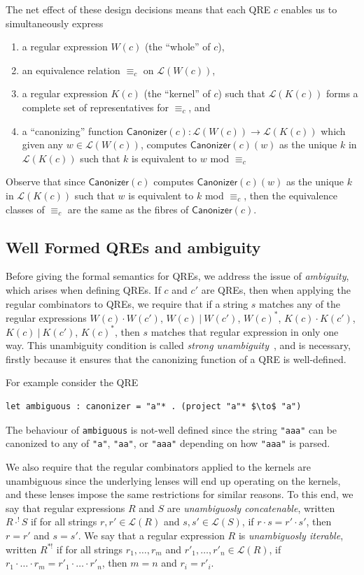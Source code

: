 \documentclass[acmsmall,review,anonymous]{acmart}
\newcommand{\kw}[1]{\ensuremath{\mathsf{#1}}}
\newcommand{\sep}{\ensuremath{\ | \ }}
\newcommand{\canonizer}{\ensuremath{\kw{Canonizer}}}
\newcommand{\eqrel}[1]{\ensuremath{\equiv_{#1}}}
\newcommand{\cd}[1]{\lstinline[backgroundcolor=\color{white}]$#1$}
\begin{document}
The net effect of these design decisions means that each QRE $c$ enables
us to simultaneously express
\begin{enumerate}
  \item a regular expression $W(c)$ (the ``whole'' of $c$),
  \item an equivalence relation $\eqrel{c}$ on $\mathcal{L}(W(c))$,
  \item a regular expression $K(c)$ (the ``kernel'' of $c$)
  such that $\mathcal{L}(K(c))$ forms a complete set of representatives for
  $\eqrel{c}$, and
  \item a ``canonizing'' function $\canonizer(c):\mathcal{L}(W(c))
  \longrightarrow \mathcal{L}(K(c))$ which given any $w \in \mathcal{L}(W(c))$,
  computes $\canonizer(c)(w)$ as the unique $k$ in $\mathcal{L}(K(c))$ such that
  $k$ is equivalent to $w$ mod $\eqrel{c}$
\end{enumerate}
Observe that since $\canonizer(c)$ computes $\canonizer(c)(w)$ as the unique
$k$ in $\mathcal{L}(K(c))$ such that $w$ is equivalent to $k$ mod $\eqrel{c}$,
then the equivalence classes of $\eqrel{c}$ are the same as the fibres of
$\canonizer(c)$.

\subsection{Well Formed QREs and ambiguity}
Before giving the formal semantics for QREs, we address the issue of {\em
ambiguity}, which arises when defining QREs. If $c$ and  $c'$ are QREs, then
when applying the regular combinators to QREs, we require that if a string $s$
matches any of the regular expressions $W(c) \cdot W(c')$, $W(c) \sep W(c')$,
$W(c)^*$, $K(c) \cdot K(c')$, $K(c) \sep K(c')$, $K(c)^*$, then $s$ matches
that regular expression in only one way. This unambiguity condition is called
{\em strong unambiguity}~\cite{Sippu1988}, and is necessary, firstly because it
ensures that the canonizing function of a QRE is well-defined.

For example consider the QRE

\begin{lstlisting}
let ambiguous : canonizer = "a"* . (project "a"* $\to$ "a")
\end{lstlisting}

\noindent The behaviour of \cd{ambiguous} is not-well defined since the string
\cd{"aaa"} can be canonized to any of \cd{"a"}, \cd{"aa"}, or \cd{"aaa"} depending on how
\cd{"aaa"} is parsed.

We also require that the regular combinators applied to
the kernels are unambiguous since the underlying lenses will end up operating
on the kernels, and these lenses impose the same restrictions for similar
reasons.
%
To this end, we say that regular expressions $R$ and $S$ are
\textit{unambiguosly concatenable}, written $R \cdot^! S$ if for all strings
$r, r' \in \mathcal{L}(R)$ and $s, s' \in \mathcal{L}(S)$, if $r \cdot s = r'
\cdot s'$, then $r = r'$ and $s = s'$. We say that a regular expression $R$ is
\textit{unambiguosly iterable}, written $R^{*!}$ if for all strings $r_1,
\ldots, r_m$ and $r'_1, \ldots, r'_n \in \mathcal{L}(R)$, if $r_1 \cdot \ldots
\cdot r_m = r'_1 \cdot \ldots \cdot r'_n$, then $m = n$ and $r_i = r'_i$.
\end{document}
